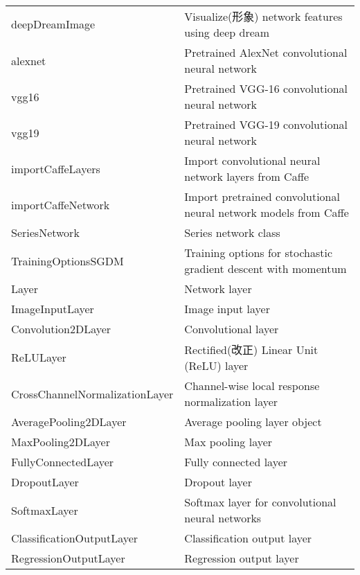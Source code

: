 \begin{table}[H]
\begin{tabularx}{\textwidth}{l|l}
          deepDreamImage&  Visualize(形象) network features using deep dream\\
          alexnet &  Pretrained AlexNet convolutional neural network\\
          vgg16  & Pretrained VGG-16 convolutional neural network\\
          vgg19 &  Pretrained VGG-19 convolutional neural network\\
          importCaffeLayers &  Import convolutional neural network layers from Caffe\\
          importCaffeNetwork & Import pretrained convolutional neural network models from Caffe\\
          SeriesNetwork &  Series network class\\
          TrainingOptionsSGDM &  Training options for stochastic gradient descent with momentum\\
          Layer&   Network layer\\
          ImageInputLayer&  Image input layer\\
          Convolution2DLayer & Convolutional layer\\
          ReLULayer &  Rectified(改正) Linear Unit (ReLU) layer\\
          CrossChannelNormalizationLayer&  Channel-wise local response normalization layer\\
          AveragePooling2DLayer &  Average pooling layer object\\
          MaxPooling2DLayer &  Max pooling layer\\
          FullyConnectedLayer &  Fully connected layer\\
          DropoutLayer & Dropout layer\\
          SoftmaxLayer & Softmax layer for convolutional neural networks\\
          ClassificationOutputLayer &  Classification output layer\\
          RegressionOutputLayer &  Regression output layer\\
          \bottomrule
          \end{tabularx}
        \end{table}

